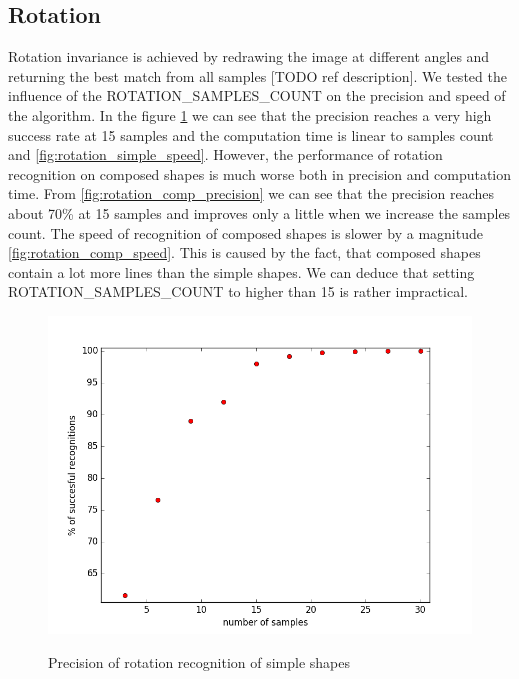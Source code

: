 \begin{description}
\section{Rotation}
Rotation invariance is achieved by redrawing the image at different angles and returning the best match from all samples [TODO ref description]. We tested the influence of the ROTATION\_SAMPLES\_COUNT on the precision and speed of the algorithm. In the figure \ref{fig:rotation_simple_precision} we can see that the precision reaches a very high success rate at 15 samples and the computation time is linear to samples count and \ref{fig:rotation_simple_speed}. However, the performance of rotation recognition on composed shapes is much worse both in precision and computation time. From \ref{fig:rotation_comp_precision} we can see that the precision reaches about 70\% at 15 samples and improves only a little when we increase the samples count. The speed of recognition of composed shapes is slower by a magnitude \ref{fig:rotation_comp_speed}. This is caused by the fact, that composed shapes contain a lot more lines than the simple shapes. We can deduce that setting ROTATION\_SAMPLES\_COUNT to higher than 15 is rather impractical.
\begin{figure}[!htb]
\begin{center}
\label{fig:rotation_simple_precision}
\includegraphics[width=\linewidth]{ext/rotation_simple_precision.png}
\end{center}
    \centering
    \caption{Precision of rotation recognition of simple shapes}
\end{figure}


\end{description}
